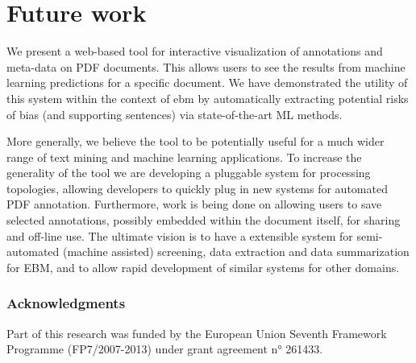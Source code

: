 \documentclass[runningheads,a4paper]{llncs}
\begin{document}
\section{Future work}
We present a web-based tool for interactive visualization of annotations and meta-data on PDF documents.
This allows users to see the results from machine learning predictions for a specific document.
We have demonstrated the utility of this system within the context of \ac{ebm} by automatically extracting potential risks of bias (and supporting sentences) via state-of-the-art ML methods.

More generally, we believe the tool to be potentially useful for a much wider range of text mining and machine learning applications.
To increase the generality of the tool we are developing a pluggable system for processing topologies, allowing developers to quickly plug in new systems for automated PDF annotation.
Furthermore, work is being done on allowing users to save selected annotations, possibly embedded within the document itself, for sharing and off-line use.
The ultimate vision is to have a extensible system for semi-automated (machine assisted) screening, data extraction and data summarization for EBM, and to allow rapid development of similar systems for other domains.

\subsubsection{Acknowledgments}
Part of this research was funded by the European Union Seventh Framework Programme (FP7/2007-2013) under grant agreement n° 261433. %



\end{document}
